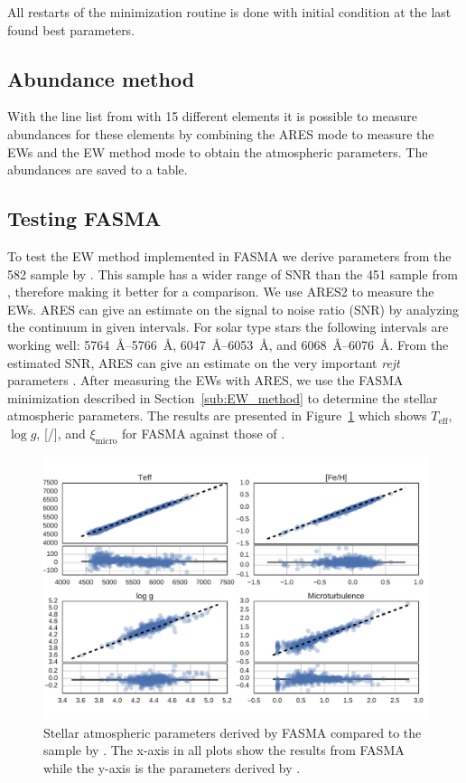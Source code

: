 \documentclass{aa}
\begin{document}
All restarts of the minimization routine is done with initial condition at the
last found best parameters.


\subsection{Abundance method}
\label{sub:Abundance_method}

With the line list from \citet{Neves2009} with 15 different elements it is
possible to measure abundances for these elements by combining the ARES mode to
measure the EWs and the EW method mode to obtain the atmospheric parameters. The
abundances are saved to a table.


\subsection{Testing FASMA}
\label{sub:Testing_FASMA}
To test the EW method implemented in FASMA we derive parameters from the 582
sample by \citet{Sousa2011}. This sample has a wider range of SNR than the 451
sample from \citet{Tsantaki2013}, therefore making it better for a comparison.
We use ARES2 to measure the EWs. ARES can give an estimate on the signal to
noise ratio (SNR) by analyzing the continuum in given intervals. For solar type
stars the following intervals are working well: \SIrange{5764}{5766}{\angstrom},
\SIrange{6047}{6053}{\angstrom}, and \SIrange{6068}{6076}{\angstrom}. From the
estimated SNR, ARES can give an estimate on the very important \emph{rejt}
parameters \citep[see][for more information]{Sousa2015a}. After measuring the
EWs with ARES, we use the FASMA minimization described in
Section~\ref{sub:EW_method} to determine the stellar atmospheric parameters. The
results are presented in Figure~\ref{fig:FASMATest} which shows
$T_\mathrm{eff}$, $\log g$, [/], and $\xi_\mathrm{micro}$ for
FASMA against those of \citet{Sousa2011}.

\begin{figure}[tpb]
    \centering
    \includegraphics[width=1.0\linewidth,natwidth=750,natheight=500]{figures/FASMATest.pdf}
    \caption{Stellar atmospheric parameters derived by FASMA compared
    to the sample by \citet{Sousa2011}. The x-axis in all plots show the results
    from FASMA while the y-axis is the parameters derived by \citet{Sousa2011}.}
    \label{fig:FASMATest}
\end{figure}
\end{document}
